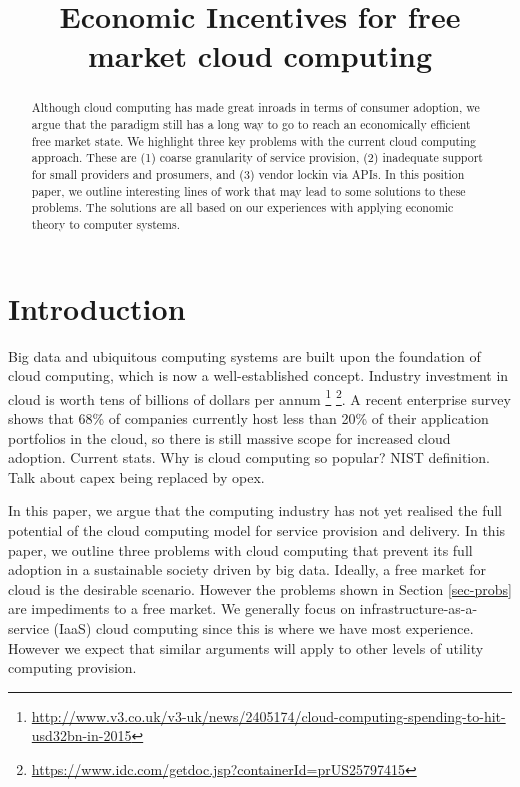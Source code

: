 \documentclass[conference,10pt]{IEEEtran}
\begin{document}
\title{Economic Incentives for free market cloud computing}


\author{
}

\maketitle


\begin{abstract}
Although cloud computing has made great inroads in terms of consumer adoption, we argue that the paradigm still has a long way to go to reach an economically efficient free market state.
We highlight three key problems with the current cloud computing approach. These are (1) coarse granularity of service provision, (2) inadequate support for small providers and prosumers, and (3) vendor lockin via APIs.
In this position paper, we outline interesting lines of work that may lead to some solutions to these problems. The solutions are all based on our experiences with applying economic theory to computer systems.
\end{abstract}


\section{Introduction}

Big data and ubiquitous computing systems are built upon the foundation of cloud computing, which is now a well-established concept. Industry investment in cloud is worth tens of billions of dollars per annum \footnote{
\url{http://www.v3.co.uk/v3-uk/news/2405174/cloud-computing-spending-to-hit-usd32bn-in-2015}} \footnote{\url{https://www.idc.com/getdoc.jsp?containerId=prUS25797415}}. 
A recent enterprise survey shows that 68\% of companies currently host less than 20\% of their application portfolios in the cloud, so there is still massive scope for increased cloud adoption.
Current stats. Why is cloud computing so popular? NIST definition. Talk about capex being replaced by opex.

In this paper, we argue that the computing industry has not yet realised the full potential of the cloud computing model for service provision and delivery. In this paper, we outline three problems with cloud computing that prevent its full adoption in a sustainable society driven by big data.
Ideally, a free market for cloud is the desirable scenario. However the problems shown in Section \ref{sec-probs}
are impediments to a free market.
We generally focus on infrastructure-as-a-service (IaaS) cloud computing since this is where we have most experience. However we expect that similar arguments will apply to other levels of utility computing provision.
\end{document}
